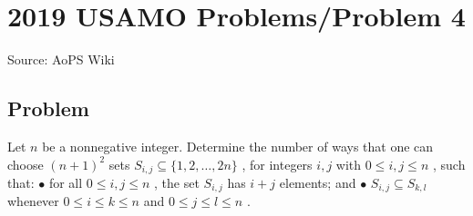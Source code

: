\documentclass[12pt]{article}
\begin{document}
\section*{{2019 USAMO Problems/Problem 4}}
Source: AoPS Wiki

\subsection*{Problem}
Let $n$ be a nonnegative integer. Determine the number of ways that one can choose $(n+1)^2$ sets $S_{i,j}\subseteq\{1,2,\ldots,2n\}$ , for integers $i,j$ with $0\leq i,j\leq n$ , such that: $\bullet$ for all $0\leq i,j\leq n$ , the set $S_{i,j}$ has $i+j$ elements; and $\bullet$ $S_{i,j}\subseteq S_{k,l}$ whenever $0\leq i\leq k\leq n$ and $0\leq j\leq l\leq n$ .
\end{document}
